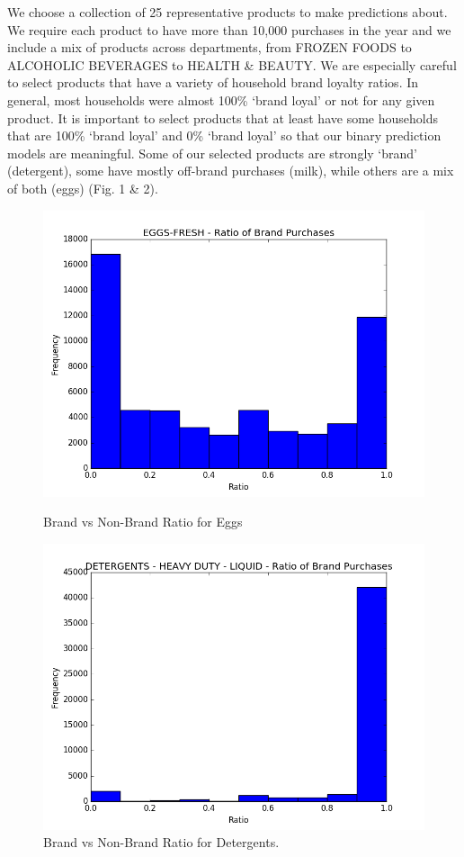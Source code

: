 \documentclass[conference]{IEEEtran}
\begin{document}
We choose a collection of 25 representative products to make predictions about. We require each product to have more than 10,000 purchases in the year and we include a mix of products across departments, from FROZEN FOODS to ALCOHOLIC BEVERAGES to HEALTH \& BEAUTY. We are especially careful to select products that have a variety of household brand loyalty ratios. In general, most households were almost 100\% `brand loyal' or not for any given product. It is important to select products that at least have some households that are 100\% `brand loyal' and 0\% `brand loyal' so that our binary prediction models are meaningful. Some of our selected products are strongly `brand' (detergent), some have mostly off-brand purchases (milk), while others are a mix of both (eggs) (Fig. 1 \& 2).


\begin{figure}[!htb]
  \includegraphics[width=\linewidth]{histogram-1}
  \caption{Brand vs Non-Brand Ratio for Eggs}\label{fig:awesome_image1}
\endminipage\hfill
{}
  \includegraphics[width=\linewidth]{histogram-2}
  \caption{Brand vs Non-Brand Ratio for Detergents.}\label{fig:awesome_image2}
\endminipage\hfill
\end{figure}
\end{document}

